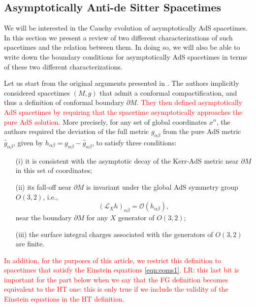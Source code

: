 \documentclass[a4paper,11pt]{article}
\numberwithin{equation}{section}
\begin{document}
\subsection{Asymptotically Anti-de Sitter Spacetimes}\label{subsec:asyAdS}

We will be interested in the Cauchy evolution of asymptotically AdS spacetimes. In this section we present a review of two different characterizations of such spacetimes and the relation between them. In doing so, we will also be able to write down the boundary conditions for asymptotically AdS spacetimes in terms of these two different characterizations.

Let us start from the original arguments presented in \cite{Henneaux:1985tv}. 
The authors implicitly considered spacetimes $(M,g)$ that admit a conformal compactification, and thus a definition of conformal boundary $\partial M$.
\textcolor{red}{They then defined asymptotically AdS spacetimes by requiring that the spacetime asymptotically approaches the pure AdS solution.}
More precisely, for any set of global coordinates $x^\alpha$, the authors required the deviation of the full metric $g_{\alpha\beta}$ from the pure AdS metric $\hat{g}_{\alpha\beta}$, given by $h_{\alpha\beta}=g_{\alpha\beta}-\hat{g}_{\alpha\beta}$, to satisfy three conditions:
\begin{enumerate}
\item[(i)] it is consistent with the asymptotic decay of the Kerr-AdS metric near $\partial M$ in this set of coordinates;
\item[(ii)] its fall-off near $\partial M$ is invariant under the global AdS symmetry group $O(3,2)$, i.e.,
\begin{equation}\label{eqn:asyKilleq}
(\mathcal{L}_X h)_{\alpha\beta}=\mathcal{O}(h_{\alpha\beta}),
\end{equation}
near the boundary $\partial M$ for any $X$ generator of $O(3,2)$;
\item[(iii)] the surface integral charges associated with the generators of $O(3,2)$ are finite.
\end{enumerate}
\textcolor{red}{In addition, for the purposes of this article, we restrict this definition to spacetimes that satisfy the Einstein equations \eqref{eqn:eoms1}.}
\textcolor{red}{LR: this last bit is important for the part below when we say that the FG definition becomes equivalent to the HT one: this is only true if we include the validity of the Einstein equations in the HT definition.}
\end{document}
